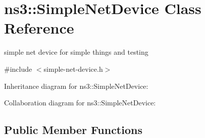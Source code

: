 \hypertarget{classns3_1_1SimpleNetDevice}{}\section{ns3\+:\+:Simple\+Net\+Device Class Reference}
\label{classns3_1_1SimpleNetDevice}


simple net device for simple things and testing  




{\ttfamily \#include $<$simple-\/net-\/device.\+h$>$}



Inheritance diagram for ns3\+:\+:Simple\+Net\+Device\+:


Collaboration diagram for ns3\+:\+:Simple\+Net\+Device\+:
\subsection*{Public Member Functions}
